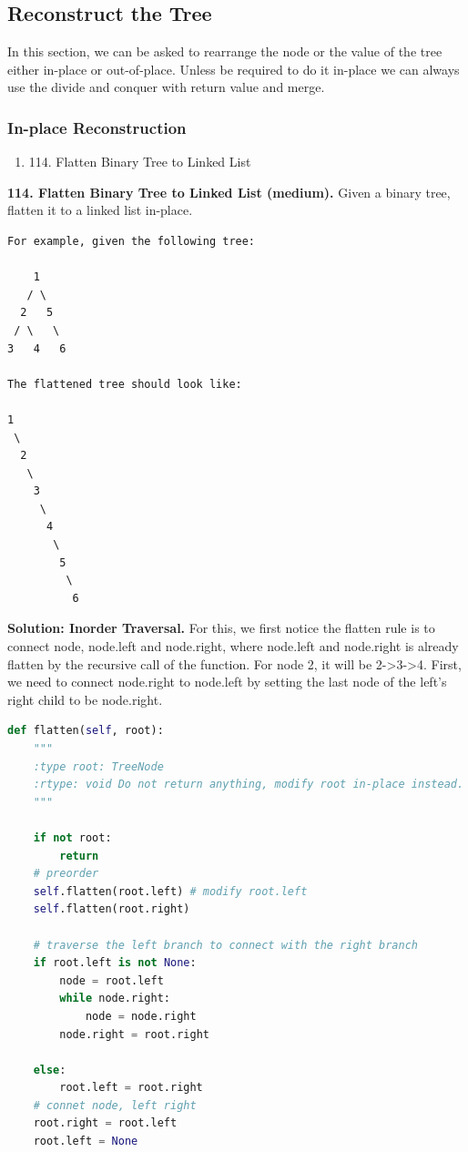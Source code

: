 \documentclass[../main.tex]{subfiles}
\begin{document}
\subsection{Reconstruct the Tree}
In this section, we can be asked to rearrange the node or the value of the tree either in-place or out-of-place. Unless be required to do it in-place we can always use the divide and conquer with return value and merge. 
\subsubsection{In-place Reconstruction}
\begin{enumerate}
    \item 114. Flatten Binary Tree to Linked List
\end{enumerate}
\begin{examples}[resume]
\item \textbf{114. Flatten Binary Tree to Linked List (medium).} Given a binary tree, flatten it to a linked list in-place.
\begin{lstlisting}[numbers=none]
For example, given the following tree:

    1
   / \
  2   5
 / \   \
3   4   6

The flattened tree should look like:

1
 \
  2
   \
    3
     \
      4
       \
        5
         \
          6
\end{lstlisting}
\textbf{Solution: Inorder Traversal.} For this, we first notice the flatten rule is to connect node, node.left and node.right, where node.left and node.right is already flatten by the recursive call of the function. For node 2, it will be 2->3->4. First, we need to connect node.right to node.left by setting the last node of the left's right child to be node.right. 
\begin{lstlisting}[language=Python]
def flatten(self, root):
    """
    :type root: TreeNode
    :rtype: void Do not return anything, modify root in-place instead.
    """

    if not root:
        return 
    # preorder
    self.flatten(root.left) # modify root.left
    self.flatten(root.right)

    # traverse the left branch to connect with the right branch
    if root.left is not None:
        node = root.left
        while node.right:
            node = node.right
        node.right = root.right

    else:
        root.left = root.right
    # connet node, left right
    root.right = root.left
    root.left = None
\end{lstlisting}


\end{examples}
\end{document}
